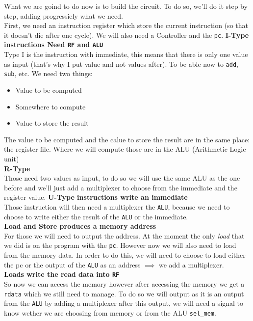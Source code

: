     What we are goind to do now is to build the circuit. To do so, we'll do it step by step, adding progressiely what we need.\\
	First, we need an instruction register which store the current instruction (so that it doesn't die after one cycle). We will also need a Controller and the \texttt{pc}.
\textbf{I-Type instructions Need \texttt{RF} and \texttt{ALU}}\\
	Type I is the instruction with immediate, this means that there is only one value as input (that's why I put value and not values after).
    To be able now to \texttt{add}, \texttt{sub}, etc. We need two things:
	\begin{itemize}
	    \item Value to be computed
	    \item Somewhere to compute
	    \item Value to store the result
	\end{itemize}
	The value to be computed and the calue to store the result are in the same place: the register file. Where we will compute those are in the ALU (Arithmetic Logic unit)\\
\textbf{R-Type}\\
	Those need two values as input, to do so we will use the same ALU as the one before and we'll just add a multiplexer to choose from the immediate and the register value.
\textbf{U-Type instructions write an immediate}\\
    Those instruction will then need a multiplexer  the \texttt{ALU}, because we need to choose to write either the result of the \texttt{ALU} or the immediate.\\
\textbf{Load and Store produces a memory address}\\
    For those we will need to output the address. At  the moment the only \textit{load} that we did is on the program with the \texttt{pc}. However now we will also need to load from the memory data. In order to do this, we will need to choose to load either the pc or the output of the \texttt{ALU} as an address $\implies$ we add a multiplexer.\\
\textbf{Loads write the read data into \texttt{RF}}\\
    So now we can access the memory however after accessing the memory we get a \texttt{rdata} which we still need to manage. To do so we will output as it is an output from the \texttt{ALU} by adding a multiplexer after this output, we will need a signal to know wether we are choosing from memory or from the ALU \texttt{sel\_mem}.\\
